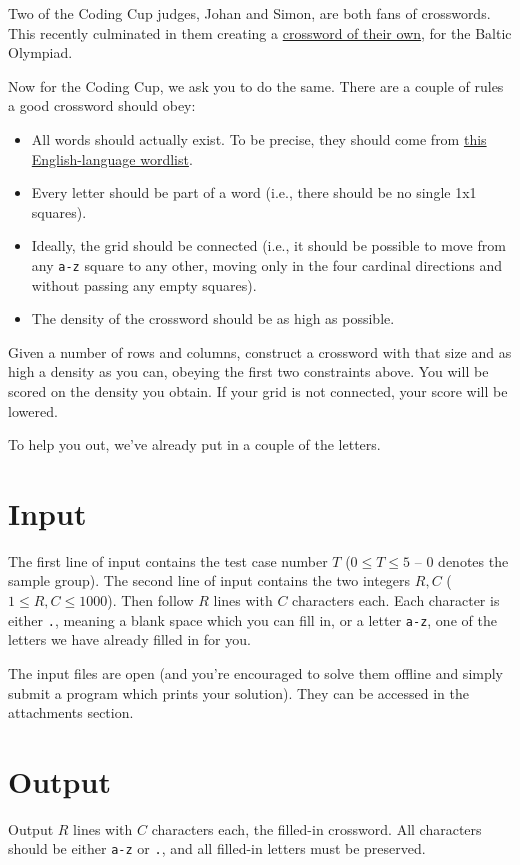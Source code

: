 Two of the Coding Cup judges, Johan and Simon, are both fans of crosswords.
This recently culminated in them creating a \href{http://boi2018.progolymp.se/day4.pdf}{crossword of their own},
for the Baltic Olympiad.

Now for the Coding Cup, we ask you to do the same. There are a couple of rules a good crossword should obey:
\begin{itemize}
  \item All words should actually exist. To be precise, they should come from \href{http://codingcup.se/2018/wordlist.txt}{this English-language wordlist}.
  \item Every letter should be part of a word (i.e., there should be no single 1x1 squares).
  \item Ideally, the grid should be connected (i.e., it should be possible to move from any \texttt{a-z} square to any other,
    moving only in the four cardinal directions and without passing any empty squares).
  \item The density of the crossword should be as high as possible.
\end{itemize}

Given a number of rows and columns, construct a crossword with that size and as high a
density as you can, obeying the first two constraints above.
You will be scored on the density you obtain.
If your grid is not connected, your score will be lowered.

To help you out, we've already put in a couple of the letters.

\section*{Input}
The first line of input contains the test case number $T$ ($0 \le T \le 5$ -- $0$ denotes the sample group).
The second line of input contains the two integers $R, C$ ($1 \le R, C \le 1000$).
Then follow $R$ lines with $C$ characters each. Each character is either \texttt{.},
meaning a blank space which you can fill in, or a letter \texttt{a-z}, one of the
letters we have already filled in for you.

The input files are open (and you're encouraged to solve them offline and simply
submit a program which prints your solution).
They can be accessed in the attachments section.

\section*{Output}
Output $R$ lines with $C$ characters each, the filled-in crossword.
All characters should be either \texttt{a-z} or \texttt{.}, and all filled-in
letters must be preserved.

